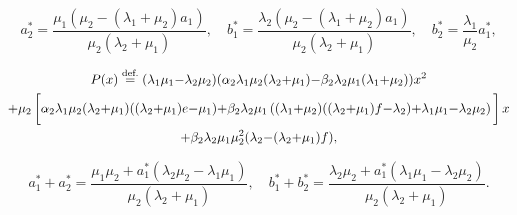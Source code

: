 \documentclass[10pt,a4paper]{amsart}
\newcommand\steq[1]{\stackrel{\text{\rm #1.}}{=}}
\begin{document}
\begin{equation}\label{abb}
a_2^*=\frac{\mu_1  \left(\mu_2 -(\lambda_1  + \mu_2)a_1   \right)}{\mu_2  \left(\lambda_2  +\mu_1  \right)},
\quad b^*_1=\frac{\lambda_2  \left(\mu_2-(\lambda_1 +\mu_2)a_1 \right)}{\mu_2  \left(\lambda_2  +\mu_1  \right)},\quad
b_2^*=\frac{\lambda_1}{\mu_2} a_1^*,
\end{equation}

\begin{multline}\label{PolyP}
P(x)\steq{def}  (\lambda_1\mu_1{-}\lambda_2\mu_2)(\alpha_2\lambda_1\mu_2 (\lambda_2{+}\mu_1){-}\beta_2\lambda_2\mu_1(\lambda_1{+}\mu_2))x^2\\
{+}\mu_2\left[\rule{0mm}{5mm}\alpha_2\lambda_1\mu_2(\lambda_2{+}\mu_1)((\lambda_2{+}\mu_1)e{-}\mu_1){+}\beta_2\lambda_2\mu_1\left((\lambda_1{+}\mu_2)((\lambda_2{+}\mu_1)f{-}\lambda_2){+}\lambda_1\mu_1{-}\lambda_2\mu_2\right)\rule{0mm}{5mm}\right]x\\
  +\beta_2  \lambda_2  \mu_1 \mu_2^{2} (\lambda_2{-}(\lambda_2{+}\mu_1)f),
\end{multline}

\begin{equation}\label{sumC}
a_1^*+a_2^*=\frac{\mu_1\mu_2+a_1^*(\lambda_2\mu_2-\lambda_1\mu_1)}{\mu_2 (\lambda_2  +\mu_1)},\quad
b_1^*+b_2^*=\frac{\lambda_2  \mu_2+a_1^*(\lambda_1\mu_1-\lambda_2\mu_2)}{\mu_2  \left(\lambda_2  +\mu_1  \right)}.
\end{equation}
\end{document}
